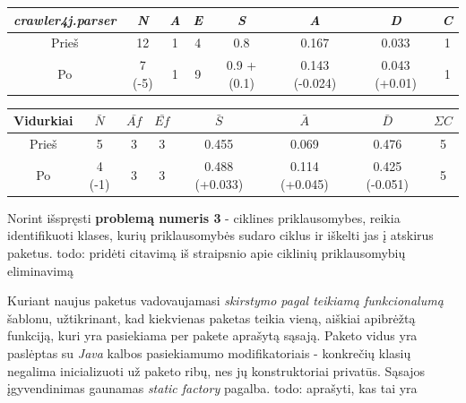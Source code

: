 \begin{center}
    \begin{tabular}{|c|c|c|c|c|c|c|c|}
        \hline
        \textit{crawler4j.parser} & \textit{N} & \textit{A} & \textit{E} & \textit{S} & \textit{A} & \textit{D} & \textit{C} \\ [0.5ex]
        \hline\hline
        Prieš & 12 & 1 & 4 & 0.8 & 0.167 & 0.033 & 1 \\
        \hline
        Po & \cellcolor{green!25} 7 (-5) & 1 & 9 & \cellcolor{red!25} 0.9 + (0.1) & \cellcolor{red!25} 0.143 (-0.024) & \cellcolor{red!25} 0.043 (+0.01) & 1 \\
        \hline
    \end{tabular}
    \begin{tabular}{|c|c|c|c|c|c|c|c|}
        \hline
        Vidurkiai & $\bar{N}$ & $\bar{Af}$ & $\bar{Ef}$ & $\bar{S}$ & $\bar{A}$ & $\bar{D}$ & $\Sigma C$ \\ [0.5ex]
        \hline\hline
        Prieš & 5 & 3 & 3 & 0.455 & 0.069 & 0.476 & 5\\
        \hline
        Po & \cellcolor{green!25}  4 (-1) & 3 & 3 & \cellcolor{red!25} 0.488 (+0.033) & \cellcolor{green!25} 0.114 (+0.045) & \cellcolor{green!25} 0.425 (-0.051) & 5 \\
        \hline
    \end{tabular}
\end{center}
Norint išspręsti \textbf{problemą numeris 3} - ciklines priklausomybes, reikia identifikuoti klases, kurių priklausomybės
sudaro ciklus ir iškelti jas į atskirus paketus.
todo: pridėti citavimą iš straipsnio apie ciklinių priklausomybių eliminavimą

Kuriant naujus paketus vadovaujamasi \textit{skirstymo pagal teikiamą funkcionalumą} šablonu, užtikrinant, kad kiekvienas
paketas teikia vieną, aiškiai apibrėžtą funkciją, kuri yra pasiekiama per pakete aprašytą sąsają.
Paketo vidus yra paslėptas su \textit{Java} kalbos pasiekiamumo modifikatoriais - konkrečių klasių negalima inicializuoti už paketo ribų,
nes jų konstruktoriai privatūs.
Sąsajos įgyvendinimas gaunamas \textit{static factory} pagalba.
todo: aprašyti, kas tai yra

